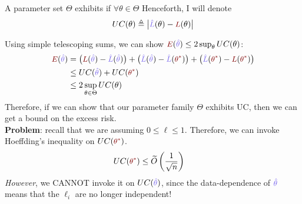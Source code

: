 \documentclass[11pt]{article}
\begin{document}
\begin{definition}
	A parameter set $\Theta$ exhibits  if $\forall \theta \in \Theta$
	Henceforth, I will denote 
	\begin{align}
		UC(\theta) \triangleq \left| \mblue{\hat L}(\theta) - \mred{L}(\theta) \right| \label{eq:def-uc}
	\end{align}
\end{definition}

\begin{example}
	Using simple telescoping sums, we can show $\mred{E}(\mblue{\hat \theta}) \leq 2 \sup_{\theta} UC(\theta)$:
	\begin{align}
		\mred{E}(\mblue{\hat \theta}) 
			&= \lr{  \mred{L}(\mblue{\hat \theta}) - \mblue{\hat L}(\mblue{\hat \theta}) }
			+ \lr{  \mblue{\hat L}(\mblue{\hat \theta}) - \mblue{\hat L}(\mred{\theta^*})  }
			+ \lr{ \mblue{\hat L}(\mred{\theta^*})  - \mred{L}(\mred{\theta^*}) } \\
			&\leq UC(\mblue{\hat \theta}) + UC(\mred{\theta^*} )\\
			&\leq 2 \sup_{\theta \in \Theta} UC(\theta) \label{eq:uc-implies-gen}
	\end{align}
	Therefore, if we can show that our parameter family $\Theta$ exhibits UC, then we can get a bound on the excess risk. \\
	
	\textbf{Problem}: recall that we are assuming $0 \leq \ell \leq 1$. Therefore, we can invoke Hoeffding's inequality on $UC(\mred{\theta^*})$. 
	\begin{align}
		UC(\mred{\theta^*})
			&\leq \widetilde{O}\lr{ \inv{\sqrt{n} } }
	\end{align}
	\textit{However}, we CANNOT invoke it on $UC(\mblue{\hat \theta})$, since the data-dependence of $\mblue{\hat \theta}$ means that the $\ell_i$ are no longer independent!
\end{example}
\end{document}
